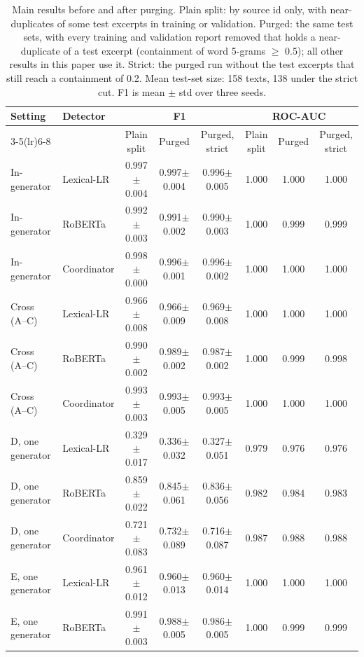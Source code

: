 \begin{table}[t]
\centering
\scriptsize
\caption{Main results before and after purging. Plain split: by source id only, with near-duplicates of some test excerpts in training or validation. Purged: the same test sets, with every training and validation report removed that holds a near-duplicate of a test excerpt (containment of word 5-grams $\geq$ 0.5); all other results in this paper use it. Strict: the purged run without the test excerpts that still reach a containment of 0.2. Mean test-set size: 158 texts, 138 under the strict cut. F1 is mean $\pm$ std over three seeds.}
\label{tab:leakage}
\begin{tabular}{llcccccc}
\toprule
Setting & Detector & \multicolumn{3}{c}{F1} & \multicolumn{3}{c}{ROC-AUC} \\
\cmidrule(lr){3-5}\cmidrule(lr){6-8}
 & & Plain split & Purged & Purged, strict & Plain split & Purged & Purged, strict \\
\midrule
In-generator & Lexical-LR & 0.997$\pm$0.004 & 0.997$\pm$0.004 & 0.996$\pm$0.005 & 1.000 & 1.000 & 1.000 \\
In-generator & RoBERTa & 0.992$\pm$0.003 & 0.991$\pm$0.002 & 0.990$\pm$0.003 & 1.000 & 0.999 & 0.999 \\
In-generator & Coordinator & 0.998$\pm$0.000 & 0.996$\pm$0.001 & 0.996$\pm$0.002 & 1.000 & 1.000 & 1.000 \\
Cross (A--C) & Lexical-LR & 0.966$\pm$0.008 & 0.966$\pm$0.009 & 0.969$\pm$0.008 & 1.000 & 1.000 & 1.000 \\
Cross (A--C) & RoBERTa & 0.990$\pm$0.002 & 0.989$\pm$0.002 & 0.987$\pm$0.002 & 1.000 & 0.999 & 0.998 \\
Cross (A--C) & Coordinator & 0.993$\pm$0.003 & 0.993$\pm$0.005 & 0.993$\pm$0.005 & 1.000 & 1.000 & 1.000 \\
D, one generator & Lexical-LR & 0.329$\pm$0.017 & 0.336$\pm$0.032 & 0.327$\pm$0.051 & 0.979 & 0.976 & 0.976 \\
D, one generator & RoBERTa & 0.859$\pm$0.022 & 0.845$\pm$0.061 & 0.836$\pm$0.056 & 0.982 & 0.984 & 0.983 \\
D, one generator & Coordinator & 0.721$\pm$0.083 & 0.732$\pm$0.089 & 0.716$\pm$0.087 & 0.987 & 0.988 & 0.988 \\
E, one generator & Lexical-LR & 0.961$\pm$0.012 & 0.960$\pm$0.013 & 0.960$\pm$0.014 & 1.000 & 1.000 & 1.000 \\
E, one generator & RoBERTa & 0.991$\pm$0.003 & 0.988$\pm$0.005 & 0.986$\pm$0.005 & 1.000 & 0.999 & 0.999 \\

\end{tabular}
\end{table}
